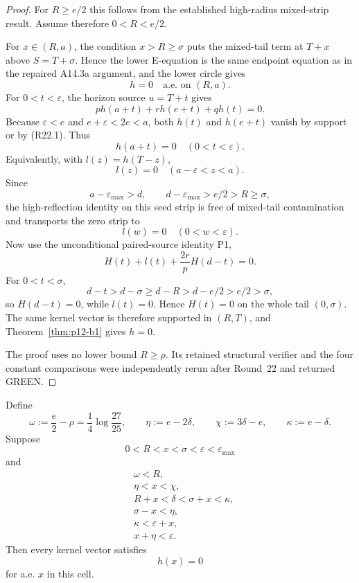 \begin{proof}
For \(R\ge e/2\) this follows from the established high-radius mixed-strip
result. Assume therefore \(0<R<e/2\).

For \(x\in(R,a)\), the condition \(x>R\ge\sigma\) puts the mixed-tail
term at \(T+x\) above \(S=T+\sigma\). Hence the lower E-equation is the
same endpoint equation as in the repaired A14.3a argument, and the lower
circle gives
\[
h=0\quad\text{a.e. on }(R,a).
\tag{R22.1}
\]
For \(0<t<\varepsilon\), the horizon source \(u=T+t\) gives
\[
p h(a+t)+r h(e+t)+q h(t)=0.
\]
Because \(\varepsilon<e\) and \(e+\varepsilon<2e<a\), both \(h(t)\)
and \(h(e+t)\) vanish by support or by (R22.1). Thus
\[
h(a+t)=0\quad(0<t<\varepsilon).
\]
Equivalently, with \(l(z)=h(T-z)\),
\[
l(z)=0\quad(a-\varepsilon<z<a).
\]
Since
\[
a-\varepsilon_{\max}>d,
\qquad
d-\varepsilon_{\max}>e/2>R\ge\sigma,
\]
the high-reflection identity on this seed strip is free of mixed-tail
contamination and transports the zero strip to
\[
l(w)=0\quad(0<w<\varepsilon).
\]
Now use the unconditional paired-source identity P1,
\[
H(t)+l(t)+\frac{2r}{p}H(d-t)=0.
\]
For \(0<t<\sigma\),
\[
d-t>d-\sigma\ge d-R>d-e/2>e/2>\sigma,
\]
so \(H(d-t)=0\), while \(l(t)=0\). Hence \(H(t)=0\) on the whole tail
\((0,\sigma)\). The same kernel vector is therefore supported in
\((R,T)\), and Theorem~\ref{thm:p12-b1} gives \(h=0\).

The proof uses no lower bound \(R\ge\rho\). Its retained structural
verifier and the four constant comparisons were independently rerun after
Round~22 and returned GREEN.
\end{proof}

\begin{proposition}
\label{prop:p12-r23-c23}
Define
\[
\omega:=\frac e2-\rho=\frac14\log\frac{27}{25},
\qquad
\eta:=e-2\delta,
\qquad
\chi:=3\delta-e,
\qquad
\kappa:=e-\delta.
\]
Suppose
\[
0<R<x<\sigma<\varepsilon<\varepsilon_{\max}
\]
and
\[
\boxed{
\begin{aligned}
&\omega<R,\\
&\eta<x<\chi,\\
&R+x<\delta<\sigma+x<\kappa,\\
&\sigma-x<\eta,\\
&\kappa<\varepsilon+x,\\
&x+\eta<\varepsilon.
\end{aligned}}
\tag{C23}
\]
Then every kernel vector satisfies
\[
\boxed{h(x)=0}
\]
for a.e. \(x\) in this cell.
\end{proposition}

